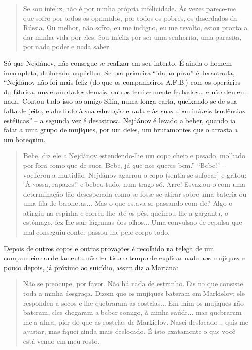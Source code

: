 \begin{quote}
Se sou infeliz, não é por minha própria infelicidade. Às vezes parece-me
que sofro por todos os oprimidos, por todos os pobres, os deserdados da
Rússia. Ou melhor, não sofro, eu me indigno, eu me revolto, estou pronta
a dar minha vida por eles. Sou infeliz por ser uma senhorita, uma
parasita, por nada poder e nada saber.
\end{quote}

Só que Nejdánov, não consegue se realizar em seu intento. É ainda o
homem incompleto, deslocado, supérfluo. Se sua primeira ``ida ao povo''
é desastrada, ``Nejdánov não foi mais feliz (do que os companheiros
A.F.B.) com os operários da fábrica: uns eram dados demais, outros
terrivelmente fechados... e não deu em nada. Contou tudo isso ao amigo
Sílin, numa longa carta, queixando-se de sua falta de jeito, e aludindo
à sua educação errada e às suas abomináveis tendências estéticas'' -- a
segunda vez é desastrosa. Nejdánov é levado a beber, quando ia falar a
uma grupo de mujiques, por um deles, um brutamontes que o arrasta a um
botequim.

\begin{quote}
Bebe, diz ele a Nejdánov estendendo-lhe um copo cheio e pesado, molhado
por fora como que de suor. Bebe, já que nos queres bem.'' ``Bebe!'' --
vociferou a multidão. Nejdánov agarrou o copo (sentia-se sufocar) e
gritou: `À vossa, rapazes!' e bebeu tudo, num trago só. Arre! Esvaziou-o
com uma determinação tão desesperada como se fosse se atirar sobre uma
bateria ou uma fila de baionetas... Mas o que estava se passando com
ele? Algo o atingiu na espinha e correu-lhe até os pés, queimou lhe a
garganta, o estômago, fez-lhe sair lágrimas dos olhos... Uma convulsão
de repulsa que mal conseguiu conter passou-lhe pelo corpo todo.
\end{quote}

Depois de outros copos e outras provações é recolhido na telega de um
companheiro onde lamenta não ter tido o tempo de explicar nada aos
mujiques e pouco depois, já próximo ao suicídio, assim diz a Mariana:

\begin{quote}
Não se preocupe, por favor. Não há nada de estranho. Eis no que consiste
toda a minha desgraça. Dizem que os mujiques bateram em Markielov; ele
respondeu a socos e lhe quebraram as costelas... Em mim os mujiques não
bateram, eles chegaram a beber comigo, à minha saúde... mas quebraram-me
a alma, pior do que as costelas de Markielov. Nasci deslocado... quis me
ajustar, mas fiquei ainda mais deslocado. É isto exatamente o que você
está vendo em meu rosto.
\end{quote}

